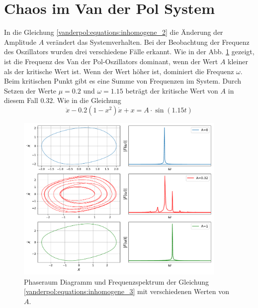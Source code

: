 \section{Chaos im Van der Pol System\label{vanderpol:section:chaos}}

In die Gleichung \ref{vanderpol:equations:inhomogene_2} die Änderung der Amplitude $A$ verändert das Systemverhalten. Bei der Beobachtung der Frequenz des Oszillators wurden drei verschiedene Fälle erkannt. Wie in der Abb. \ref{vanderpol:figures:fft} gezeigt, ist die Frequenz des Van der Pol-Oszillators dominant, wenn der Wert $A$ kleiner als der kritische Wert ist. Wenn der Wert höher ist, dominiert die Frequenz $\omega$. Beim kritischen Punkt gibt es eine Summe von Frequenzen im System. Durch Setzen der Werte $\mu=0.2$ und $\omega=1.15$ beträgt der kritische Wert von $A$ in diesem Fall $0.32$. Wie in die Gleichung
\begin{equation}
	\ddot{x}-0.2\left(1-x^{2}\right) \dot{x}+x = A \cdot \sin(1.15 t)
	\label{vanderpol:equations:inhomogene_3}
\end{equation}

\begin{figure}
	\centering
	\includegraphics[width=0.9\textwidth]{papers/vanderpol/figures/fft_plot2.pdf}
	\caption{Phaseraum Diagramm und Frequenzspektrum der Gleichung \ref{vanderpol:equations:inhomogene_3} mit verschiedenen Werten von $A$.\label{vanderpol:figures:fft}}
\end{figure}

